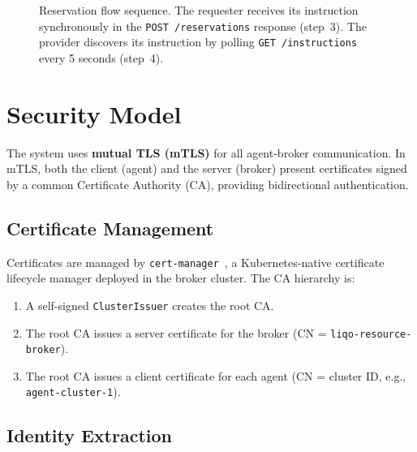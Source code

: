 \begin{figure}[htbp]
\caption{Reservation flow sequence. The requester receives its instruction synchronously in the \texttt{POST /reservations} response (step~3). The provider discovers its instruction by polling \texttt{GET /instructions} every 5 seconds (step~4).}
\label{fig:sequence}
\end{figure}


\section{Security Model}
\label{sec:security}

The system uses \textbf{mutual TLS (mTLS)} for all agent-broker communication. In mTLS, both the client (agent) and the server (broker) present certificates signed by a common Certificate Authority (CA), providing bidirectional authentication.

\subsection{Certificate Management}

Certificates are managed by \texttt{cert-manager}~\cite{cert-manager}, a Kubernetes-native certificate lifecycle manager deployed in the broker cluster. The CA hierarchy is:

\begin{enumerate}
    \item A self-signed \texttt{ClusterIssuer} creates the root CA.
    \item The root CA issues a server certificate for the broker (CN = \texttt{liqo-resource-broker}).
    \item The root CA issues a client certificate for each agent (CN = cluster ID, e.g., \texttt{agent-cluster-1}).
\end{enumerate}

\subsection{Identity Extraction}

